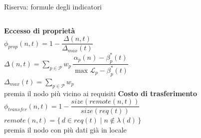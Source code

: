 \documentclass[aspectratio=169,12pt]{beamer}
\begin{document}
\begin{frame}{Riserva: formule degli indicatori}
\begin{columns}[T]
\centering
\textbf{\color{unimi}Eccesso di proprietà}\\[3mm]
$\phi_{prop}(n,t) = 1 - \dfrac{\Delta(n,t)}{\Delta_{max}(t)}$\\[3mm]
{\small $\Delta(n,t) = \sum_{p \in \mathcal{P}} w_p\, \dfrac{\alpha_p(n) - \beta^*_p(t)}{\max \mathcal{L}_p - \beta^*_p(t)}$\\[2mm] $\Delta_{max}(t) = \sum_{p \in \mathcal{P}} w_p$}\\[3mm]
{\footnotesize\color{black!65} premia il nodo più vicino ai requisiti}
\centering
\textbf{\color{unimi}Costo di trasferimento}\\[3mm]
$\phi_{transfer}(n,t) = 1 - \dfrac{size(remote(n,t))}{size(req(t))}$\\[3mm]
{\small $remote(n,t) = \{\, d \in req(t) \mid n \notin \lambda(d) \,\}$}\\[3mm]
{\footnotesize\color{black!65} premia il nodo con più dati già in locale}
\end{columns}
\vspace{6mm}
\begin{center}
\end{center}
\end{frame}
\end{document}
